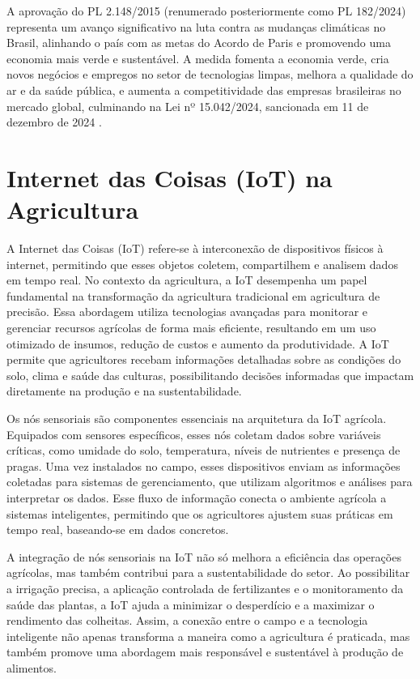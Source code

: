 A aprovação do PL 2.148/2015 (renumerado posteriormente como PL 182/2024) representa um avanço significativo na luta contra as mudanças climáticas no Brasil, alinhando o país com as metas do Acordo de Paris e promovendo uma economia mais verde e sustentável. A medida fomenta a economia verde, cria novos negócios e empregos no setor de tecnologias limpas, melhora a qualidade do ar e da saúde pública, e aumenta a competitividade das empresas brasileiras no mercado global, culminando na Lei nº 15.042/2024, sancionada em 11 de dezembro de 2024 .

\section{Internet das Coisas (IoT) na Agricultura}

A Internet das Coisas (IoT) refere-se à interconexão de dispositivos físicos à internet, permitindo que esses objetos coletem, compartilhem e analisem dados em tempo real. No contexto da agricultura, a IoT desempenha um papel fundamental na transformação da agricultura tradicional em agricultura de precisão. Essa abordagem utiliza tecnologias avançadas para monitorar e gerenciar recursos agrícolas de forma mais eficiente, resultando em um uso otimizado de insumos, redução de custos e aumento da produtividade. A IoT permite que agricultores recebam informações detalhadas sobre as condições do solo, clima e saúde das culturas, possibilitando decisões informadas que impactam diretamente na produção e na sustentabilidade.

Os nós sensoriais são componentes essenciais na arquitetura da IoT agrícola. Equipados com sensores específicos, esses nós coletam dados sobre variáveis críticas, como umidade do solo, temperatura, níveis de nutrientes e presença de pragas. Uma vez instalados no campo, esses dispositivos enviam as informações coletadas para sistemas de gerenciamento, que utilizam algoritmos e análises para interpretar os dados. Esse fluxo de informação conecta o ambiente agrícola a sistemas inteligentes, permitindo que os agricultores ajustem suas práticas em tempo real, baseando-se em dados concretos.

A integração de nós sensoriais na IoT não só melhora a eficiência das operações agrícolas, mas também contribui para a sustentabilidade do setor. Ao possibilitar a irrigação precisa, a aplicação controlada de fertilizantes e o monitoramento da saúde das plantas, a IoT ajuda a minimizar o desperdício e a maximizar o rendimento das colheitas. Assim, a conexão entre o campo e a tecnologia inteligente não apenas transforma a maneira como a agricultura é praticada, mas também promove uma abordagem mais responsável e sustentável à produção de alimentos.


